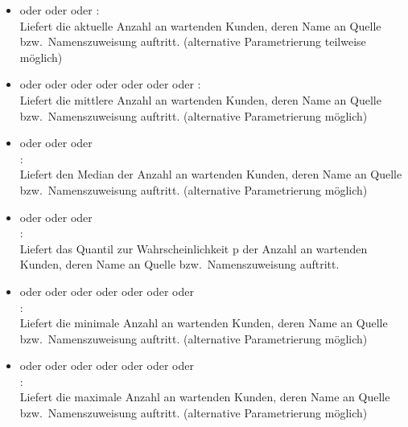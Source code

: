 \begin{itemize}    

\item
{} oder  oder  oder :\\
Liefert die aktuelle Anzahl an wartenden Kunden, deren Name an Quelle bzw.\ Namenszuweisung  auftritt.
(alternative Parametrierung teilweise möglich)
 
\item
{} oder  oder  oder  oder  oder  oder  oder :\\
Liefert die mittlere Anzahl an wartenden Kunden, deren Name an Quelle bzw.\ Namenszuweisung  auftritt.
(alternative Parametrierung möglich)

\item
{} oder  oder  oder\\
:\\
Liefert den Median der Anzahl an wartenden Kunden, deren Name an Quelle bzw.\ Namenszuweisung  auftritt.
(alternative Parametrierung möglich)

\item
{} oder  oder  oder\\
:\\
Liefert das Quantil zur Wahrscheinlichkeit p der Anzahl an wartenden Kunden, deren Name an Quelle bzw.\ Namenszuweisung  auftritt.

\item
{} oder  oder  oder  oder  oder  oder  oder\\
:\\
Liefert die minimale Anzahl an wartenden Kunden, deren Name an Quelle bzw.\ Namenszuweisung  auftritt.
(alternative Parametrierung möglich)

\item
{} oder  oder  oder  oder  oder  oder  oder\\
:\\
Liefert die maximale Anzahl an wartenden Kunden, deren Name an Quelle bzw.\ Namenszuweisung  auftritt.
(alternative Parametrierung möglich)


\end{itemize}
